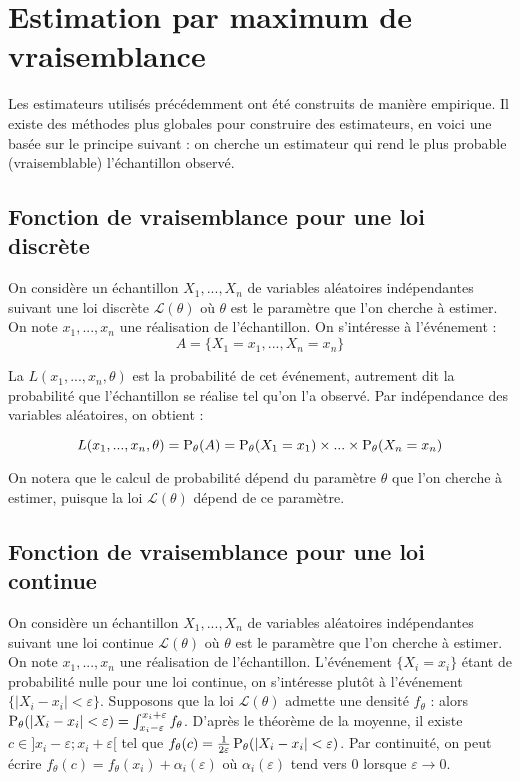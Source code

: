 \section{Estimation par maximum de vraisemblance}
Les estimateurs utilisés précédemment ont été construits de manière empirique. Il existe des méthodes plus globales pour construire des estimateurs, en voici une basée sur le principe suivant : on cherche un estimateur qui rend le plus probable (vraisemblable) l'échantillon observé.


\subsection{Fonction de vraisemblance pour une loi discrète}

On considère un échantillon $X_1,...,X_n$ de variables aléatoires indépendantes suivant une loi discrète $\mathcal{L}(\theta)$ où $\theta$ est le paramètre que l'on cherche à estimer. On note $x_1,...,x_n$ une réalisation de l'échantillon. On s'intéresse à l'événement : 
$$A = \{X_1=x_1,...,X_n=x_n\}$$

La  $L(x_1,...,x_n, \theta)$ est la probabilité de cet événement, autrement dit la probabilité que l'échantillon se réalise tel qu'on l'a observé. Par indépendance des variables aléatoires, on obtient :

$$L(x_1,...,x_n, \theta) = \operatorname{P}_\theta(A) = \operatorname{P}_\theta(X_1=x_1) \times ... \times \operatorname{P}_\theta(X_n=x_n)$$

On notera que le calcul de probabilité dépend du paramètre $\theta$ que l'on cherche à estimer, puisque la loi $\mathcal{L}(\theta)$ dépend de ce paramètre.

\subsection{Fonction de vraisemblance pour une loi continue}

On considère un échantillon $X_1,...,X_n$ de variables aléatoires indépendantes suivant une loi continue $\mathcal{L}(\theta)$ où $\theta$ est le paramètre que l'on cherche à estimer. On note $x_1,...,x_n$ une réalisation de l'échantillon. L'événement $\{X_i=x_i\}$ étant de probabilité nulle pour une loi continue, on s'intéresse plutôt à l'événement $\{|X_i-x_i|<\varepsilon\}$. Supposons que la loi $\mathcal{L}(\theta)$ admette une densité $f_{\theta}$ : alors $\operatorname{P}_{\theta}(|X_i-x_i|<\varepsilon) = \int_{x_i-\varepsilon}^{x_i+\varepsilon} f_{\theta}$. D'après le théorème de la moyenne, il existe $c \in ]x_i-\varepsilon;x_i+\varepsilon[$ tel que $f_{\theta}(c) = \frac{1}{2\varepsilon} \operatorname{P}_{\theta}(|X_i-x_i|<\varepsilon)$. Par continuité, on peut écrire $f_{\theta}(c) = f_{\theta}(x_i)+\alpha_i(\varepsilon)$ où $\alpha_i(\varepsilon)$ tend vers $0$ lorsque $\varepsilon \to 0$. 

